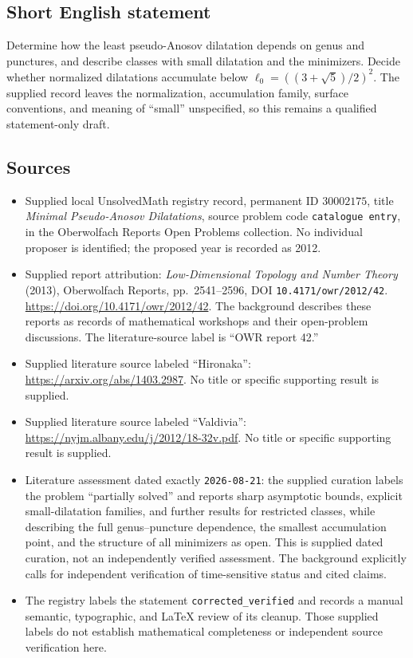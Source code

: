 \documentclass[11pt]{article}
\begin{document}
\subsection{Short English statement}
Determine how the least pseudo-Anosov dilatation depends on genus and punctures, and describe classes with small dilatation and the minimizers. Decide whether normalized dilatations accumulate below \(\ell_0=((3+\sqrt5)/2)^2\). The supplied record leaves the normalization, accumulation family, surface conventions, and meaning of ``small'' unspecified, so this remains a qualified statement-only draft.
\subsection{Sources}
\begin{itemize}
\item Supplied local UnsolvedMath registry record, permanent ID \(30002175\), title \emph{Minimal Pseudo-Anosov Dilatations}, source problem code \texttt{catalogue entry}, in the Oberwolfach Reports Open Problems collection. No individual proposer is identified; the proposed year is recorded as 2012.
\item Supplied report attribution: \emph{Low-Dimensional Topology and Number Theory} (2013), Oberwolfach Reports, pp.\ 2541--2596, DOI \texttt{10.4171/owr/2012/42}. \url{https://doi.org/10.4171/owr/2012/42}. The background describes these reports as records of mathematical workshops and their open-problem discussions. The literature-source label is ``OWR report 42.''
\item Supplied literature source labeled ``Hironaka'': \url{https://arxiv.org/abs/1403.2987}. No title or specific supporting result is supplied.
\item Supplied literature source labeled ``Valdivia'': \url{https://nyjm.albany.edu/j/2012/18-32v.pdf}. No title or specific supporting result is supplied.
\item Literature assessment dated exactly \texttt{2026-08-21}: the supplied curation labels the problem ``partially solved'' and reports sharp asymptotic bounds, explicit small-dilatation families, and further results for restricted classes, while describing the full genus--puncture dependence, the smallest accumulation point, and the structure of all minimizers as open. This is supplied dated curation, not an independently verified assessment. The background explicitly calls for independent verification of time-sensitive status and cited claims.
\item The registry labels the statement \texttt{corrected\_verified} and records a manual semantic, typographic, and LaTeX review of its cleanup. Those supplied labels do not establish mathematical completeness or independent source verification here.
\end{itemize}
\end{document}
